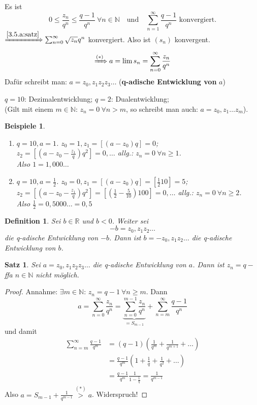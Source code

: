\documentclass[14pt,titlepage,ngerman,a4paper,headsepline,DIV15,halfparskip*]{scrartcl}
\newcommand{\N}{\mathbb{N}}
\newcommand{\R}{\mathbb{R}}
\theoremstyle{named}
\theoremstyle{dotless}
\newtheorem{satz}[namedtheorem]{Satz}
\newtheorem*{beispiele}{Beispiele}
\newtheorem*{definition}{Definition}
\begin{document}
Es ist
	$$ 0 \leq \frac{z_{n}}{q^{n}} \leq \frac{q - 1}{q^n} ~\forall n \in \N \quad \text{und} \quad \sum_{n=1}^{\infty} \frac{q - 1}{q^{n}} \text{ konvergiert}. $$
$\xRightarrow[]{\ref{3.5.a:satz}} \sum_{n=0}^{\infty}\sqrt{z_{n}}{q^{n}}$ konvergiert. Also ist $(s_{n})$ konvergent.
	$$ \xRightarrow[]{(*)} a = \lim s_{n} = \sum_{n=0}^{\infty} \frac{z_{n}}{q^{n}} $$
Dafür schreibt man: $a = z_{0}, z_{1} z_{2} z_{3} \dotsc$ (\textbf{q-adische Entwicklung von }$a$)

$q = 10$: Dezimalentwicklung; $q = 2$: Dualentwicklung; \\
(Gilt mit einem $m \in \N$: $z_{n} = 0 ~\forall n > m$, so schreibt man auch: $a = z_{0}, z_{1} \dotsc z_{m}$).


\begin{beispiele} ~\
	\begin{enumerate}
		\item $q = 10, a = 1$. $z_{0} = 1, z_{1} = [(a - z_{0})q] = 0$; \\
			$z_{2} = [(a - z_{0} - \frac{z_{1}}{q})q^{2}] = 0, \dotsc$ allg.: $z_{n} = 0 ~\forall n \geq 1$. \\
			Also $1 = 1,000\dotsc$
		\item $q = 10, a = \frac{1}{2}$. $z_{0} = 0, z_{1} = [(a - z_{0})q] = [\frac{1}{2} 10] = 5$; \\
			$z_{2} = [(a - z_{0} - \frac{z_{1}}{q})q^{2}] = [(\frac{1}{2} - \frac{5}{10}) 100] = 0, \dotsc$ allg.: $z_{n} = 0 ~\forall n \geq 2$. \\
			Also $\frac{1}{2} = 0,5000\dotsc = 0,5$
	\end{enumerate}
\end{beispiele}


\begin{definition}
	Sei $b \in \R$ und $b < 0$. Weiter sei
		$$ -b = z_{0}, z_{1} z_{2} \dotsc $$
	die q-adische Entwicklung von $-b$. Dann ist $b = - z_{0}, z_{1} z_{2} \dotsc$ die q-adische Entwicklung von $b$.
\end{definition}


\begin{satz} \label{5.2:satz}
	Sei $a = z_{0}, z_{1} z_{2} z_{3} \dotsc$ die q-adische Entwicklung von $a$. Dann ist $z_{n} = q -$ ffa $n \in \N$ nicht möglich.
\end{satz}

\begin{proof}
	Annahme: $\exists m \in \N$: $z_{n} = q - 1 ~\forall n \geq m$. Dann 
		$$ a = \sum_{n=0}^{\infty} \frac{z_{n}}{q^{n}} = \underbrace{\sum_{n=0}^{m-1} \frac{z_{n}}{q^{n}}}_{= S_{m-1}} + \sum_{n=m}^{\infty} \frac{q-1}{q^{n}} $$
	und damit
	\begin{align*}
		\sum_{n=m}^{\infty} \frac{q-1}{q^{m}} & = (q-1) \left( \frac{1}{q^{m}} + \frac{1}{q^{m+1}} + \dotsc \right) \\
			& = \frac{q - 1}{q^{m}} (1 + \frac{1}{q} + \frac{1}{q^{2}} + \dotsc) \\
			& = \frac{q - 1}{q^{m}} \frac{1}{1 - \frac{1}{q}} = \frac{1}{q^{m-1}}
	\end{align*} 
	Also $a = S_{m-1} + \frac{1}{q^{m-1}} \overset{(*)}{>} a$. Widerspruch!
\end{proof}
\end{document}
